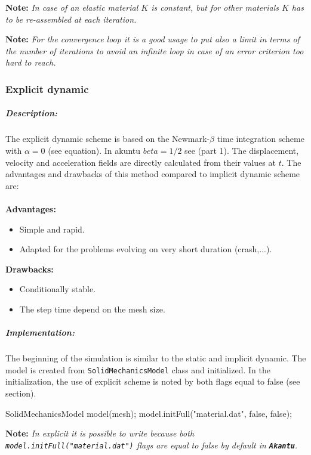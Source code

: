 \documentclass[a4paper,11pt]{book}
\newcommand{\akantu}{\texttt{\textbf{Akantu}}\xspace}
\newcommand{\code}[1]{\texttt{#1}}
\newcommand{\note}[1]{\textbf{Note: }\textit{#1}}
\begin{document}
\note{In case  of an elastic material  $K$ is constant, but  for other materials
  $K$ has to be re-assembled at each iteration.}

\note{For the convergence loop  it is a good usage to put  also a limit in terms
  of the  number of iterations  to avoid  an infinite loop  in case of  an error
  criterion too hard to reach.}

\subsubsection{Explicit dynamic}

\subparagraph{Description:}\label{ref:smm:explicit:paragraphdescription}

The explicit dynamic scheme is based on the Newmark-$\beta$ time integration 
scheme with $\alpha=0$ (see equation). In akuntu $beta=1/2$ see (part 1). The 
displacement, velocity and acceleration fields are directly calculated from 
their values at $t$. The advantages and drawbacks of this method compared to 
implicit dynamic scheme are:
\\
\\
\textbf{Advantages:}
\begin{itemize}
\item Simple and rapid.
\item Adapted for the problems evolving on very short duration (crash,...).
\end{itemize}
\textbf{Drawbacks:}
\begin{itemize}
\item Conditionally stable.
\item The step time depend on the mesh size.
\end{itemize}

\subparagraph{Implementation:}

The beginning of the simulation is similar to the static and implicit dynamic. 
The model is created from \code{SolidMechanicsModel} class and initialized. 
In the initialization, the use of explicit scheme is noted by both flags equal
 to false (see section). 

\begin{cpp}
  SolidMechanicsModel model(mesh);
  model.initFull("material.dat", false, false);
\end{cpp}

\note{In explicit it is possible to write because both  
 \code{model.initFull("material.dat")}
 flags are equal to false by default in \akantu.}
\end{document}
